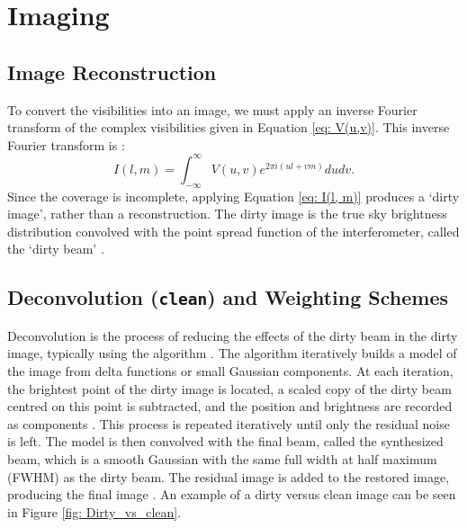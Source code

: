


\section{Imaging}


\subsection{Image Reconstruction}
To convert the visibilities into an image, we must apply an inverse Fourier transform of the complex visibilities given in Equation \ref{eq: V(u,v)}.  This inverse Fourier transform is \citep{Thompson}:
\begin{equation}
    I(l,m) = \int_{-\infty}^\infty V(u,v) e^{2\pi i(ul+vm)}dudv.
    \label{eq: I(l, m)}
\end{equation}
\noindent Since the \uv coverage is incomplete, applying Equation \ref{eq: I(l, m)} produces a `dirty image', rather than a reconstruction. The dirty image is the true sky brightness distribution convolved with the point spread function of the interferometer, called the `dirty beam' \citep{Marvil2026}.



\subsection{Deconvolution (\texttt{clean}) and Weighting Schemes}
\label{sec: inter_weighting}
Deconvolution is the process of reducing the effects of the dirty beam in the dirty image, typically using the algorithm \clean \citep{Thompson, Marvil2026}. The \clean algorithm iteratively builds a model of the image from delta functions or small Gaussian components. At each iteration, the brightest point of the dirty image is located, a scaled copy of the dirty beam centred on this point is subtracted, and the position and brightness are recorded as \clean components \citep{Monnier}. This process is repeated iteratively until only the residual noise is left. The \clean model is then convolved with the final \clean beam, called the synthesized beam, which is a smooth Gaussian with the same full width at half maximum (FWHM) as the dirty beam. The residual image is added to the restored image, producing the final \clean image \citep{Thompson}. An example of a dirty versus clean image can be seen in Figure \ref{fig: Dirty_vs_clean}. 


